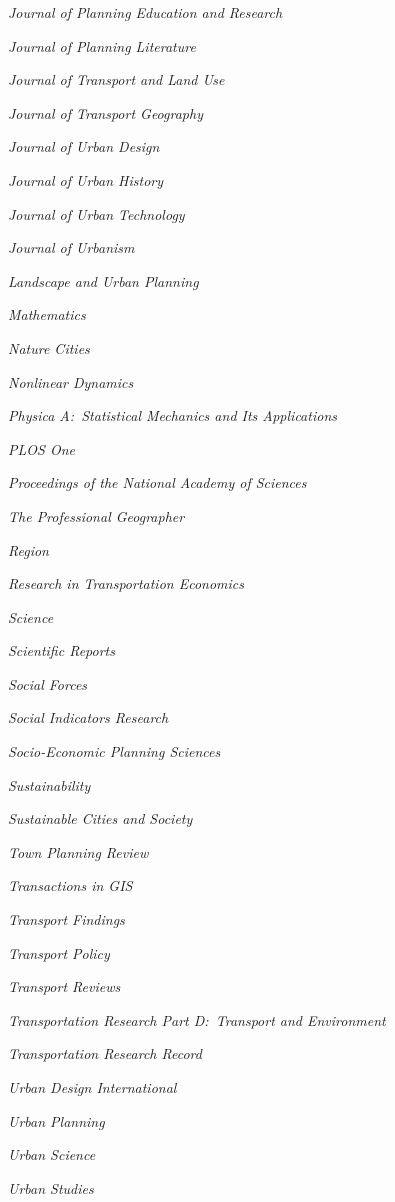 \documentclass[11pt,a4paper]{report} %
\newcommand{\listitemspace}{0.25em}
\renewenvironment{itemize}
{
  \begin{list}{}{\setlength{\leftmargin}{0em}
      \setlength{\parskip}{0em}
      \setlength{\itemsep}{\listitemspace}
  \setlength{\parsep}{\listitemspace}}}
  {
\end{list}}
\begin{document}
\begin{itemize}
  \item \textit{Journal of Planning Education and Research}
  \item \textit{Journal of Planning Literature}
  \item \textit{Journal of Transport and Land Use}
  \item \textit{Journal of Transport Geography}
  \item \textit{Journal of Urban Design}
  \item \textit{Journal of Urban History}
  \item \textit{Journal of Urban Technology}
  \item \textit{Journal of Urbanism}
  \item \textit{Landscape and Urban Planning}
  \item \textit{Mathematics}
  \item \textit{Nature Cities}
  \item \textit{Nonlinear Dynamics}
  \item \textit{Physica A:\ Statistical Mechanics and Its Applications}
  \item \textit{PLOS One}
  \item \textit{Proceedings of the National Academy of Sciences}
  \item \textit{The Professional Geographer}
  \item \textit{Region}
  \item \textit{Research in Transportation Economics}
  \item \textit{Science}
  \item \textit{Scientific Reports}
  \item \textit{Social Forces}
  \item \textit{Social Indicators Research}
  \item \textit{Socio-Economic Planning Sciences}
  \item \textit{Sustainability}
  \item \textit{Sustainable Cities and Society}
  \item \textit{Town Planning Review}
  \item \textit{Transactions in GIS}
  \item \textit{Transport Findings}
  \item \textit{Transport Policy}
  \item \textit{Transport Reviews}
  \item \textit{Transportation Research Part D:\ Transport and Environment}
  \item \textit{Transportation Research Record}
  \item \textit{Urban Design International}
  \item \textit{Urban Planning}
  \item \textit{Urban Science}
  \item \textit{Urban Studies}

\end{itemize}
\end{document}
